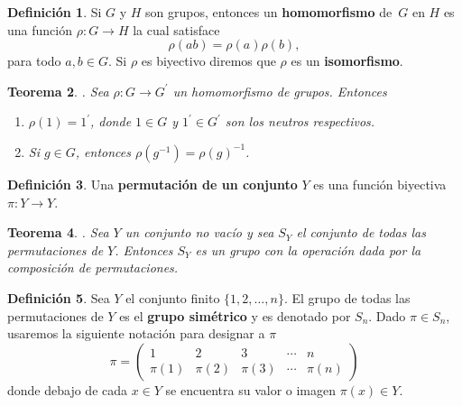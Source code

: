\documentclass[12pt]{book}
\newtheorem{theorem}{Teorema}[section]
\theoremstyle{definition}
\newtheorem{definition}[theorem]{Definición}
\DeclareMathOperator{\im}{im}
\newcounter{in}
\newcounter{ini}
\begin{document}
\begin{definition}
  Si $G$ y $H$ son grupos, entonces un \textbf{homomorfismo} de~$G$
  en $H$ es una función $\rho:G\rightarrow H$ la cual
  satisface $$\rho(ab)=\rho(a)\rho(b),$$
  para todo $a,b \in G$. Si $\rho$ es biyectivo diremos que $\rho$ es
  un \textbf{isomorfismo}.
\end{definition}

\begin{theorem}{}.
  Sea $\rho:G\rightarrow G^{'}$ un homomorfismo de grupos. Entonces
  \begin{enumerate}
    \item $\rho(1)=1^{'}$, donde $1\in G$ y  $1^{'}\in G^{'}$ son los
    neutros respectivos. 
    \item Si $g\in G$, entonces $\rho(g^{-1})=\rho (g)^{-1}$.
  \end{enumerate}
\end{theorem}


\begin{definition}
  Una \textbf{permutación de un conjunto} $Y$ es una función biyectiva
  $\pi:Y\rightarrow Y$.
\end{definition}

\begin{theorem}{}.
  Sea $Y$ un conjunto no vacío y sea $S_{Y}$ el conjunto de todas las
  permutaciones de $Y$. Entonces $S_{Y}$ es un grupo con la operación dada por la composición de
  permutaciones.
\end{theorem}

\begin{definition}
  Sea $Y$ el conjunto finito $\{1,2,\ldots,n\}$. El grupo de todas las
  permutaciones de $Y$ es el\textbf{ grupo simétrico} y es denotado
  por $S_{n}$. Dado $\pi \in S_{n}$, usaremos la siguiente notación
  para designar a $\pi$
  \[ \pi=\left(
    \begin{array}{ccccc}
      1 & 2 & 3 & \cdots & n\\
      \pi(1) & \pi(2) & \pi(3) & \cdots & \pi(n) 
    \end{array} 
  \right)\] 
  donde debajo de cada $x\in Y$ se encuentra su valor o imagen
  $\pi(x)\in Y$.
\end{definition}
\end{document}
